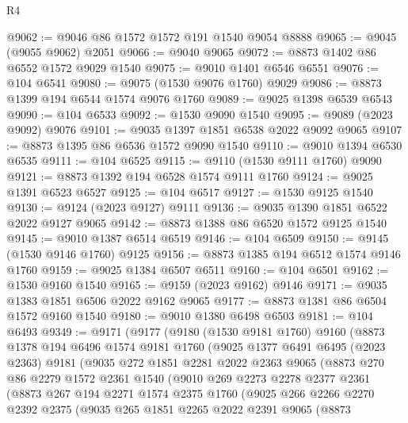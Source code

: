 \begin{lexlean}{R4}
\begin{coremodule}
@9062 := @9046 @86 @1572 @1572 @191 @1540 @9054 @8888
@9065 := @9045 (@9055 @9062) @2051
@9066 := @9040 @9065
@9072 := @8873 @1402 @86 @6552 @1572 @9029 @1540
@9075 := @9010 @1401 @6546 @6551
@9076 := @104 @6541
@9080 := @9075 (@1530 @9076 @1760) @9029
@9086 := @8873 @1399 @194 @6544 @1574 @9076 @1760
@9089 := @9025 @1398 @6539 @6543
@9090 := @104 @6533
@9092 := @1530 @9090 @1540
@9095 := @9089 (@2023 @9092) @9076
@9101 := @9035 @1397 @1851 @6538 @2022 @9092 @9065
@9107 := @8873 @1395 @86 @6536 @1572 @9090 @1540
@9110 := @9010 @1394 @6530 @6535
@9111 := @104 @6525
@9115 := @9110 (@1530 @9111 @1760) @9090
@9121 := @8873 @1392 @194 @6528 @1574 @9111 @1760
@9124 := @9025 @1391 @6523 @6527
@9125 := @104 @6517
@9127 := @1530 @9125 @1540
@9130 := @9124 (@2023 @9127) @9111
@9136 := @9035 @1390 @1851 @6522 @2022 @9127 @9065
@9142 := @8873 @1388 @86 @6520 @1572 @9125 @1540
@9145 := @9010 @1387 @6514 @6519
@9146 := @104 @6509
@9150 := @9145 (@1530 @9146 @1760) @9125
@9156 := @8873 @1385 @194 @6512 @1574 @9146 @1760
@9159 := @9025 @1384 @6507 @6511
@9160 := @104 @6501
@9162 := @1530 @9160 @1540
@9165 := @9159 (@2023 @9162) @9146
@9171 := @9035 @1383 @1851 @6506 @2022 @9162 @9065
@9177 := @8873 @1381 @86 @6504 @1572 @9160 @1540
@9180 := @9010 @1380 @6498 @6503
@9181 := @104 @6493
@9349 := @9171
    (@9177
      (@9180
        (@1530 @9181 @1760)
        @9160
        (@8873
          @1378
          @194
          @6496
          @1574
          @9181
          @1760
          (@9025
            @1377
            @6491
            @6495
            (@2023 @2363)
            @9181
            (@9035
              @272
              @1851
              @2281
              @2022
              @2363
              @9065
              (@8873
                @270
                @86
                @2279
                @1572
                @2361
                @1540
                (@9010
                  @269
                  @2273
                  @2278
                  @2377
                  @2361
                  (@8873
                    @267
                    @194
                    @2271
                    @1574
                    @2375
                    @1760
                    (@9025
                      @266
                      @2266
                      @2270
                      @2392
                      @2375
                      (@9035
                        @265
                        @1851
                        @2265
                        @2022
                        @2391
                        @9065
                        (@8873

\end{coremodule}
\end{lexlean}
